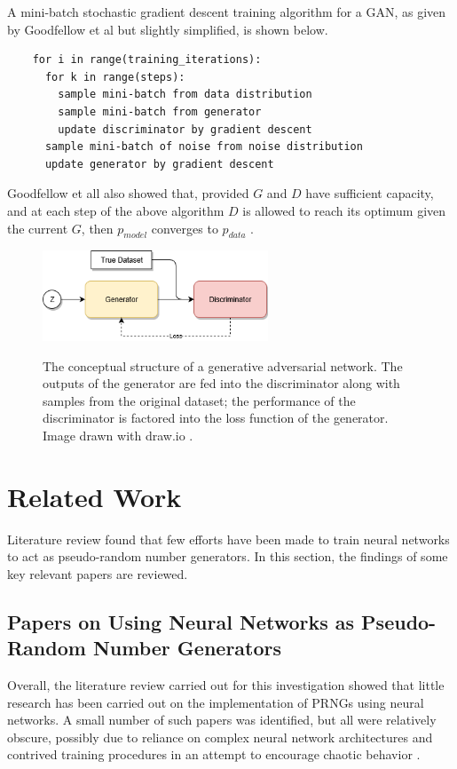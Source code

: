\documentclass[12pt, titlepage]{report}
\theoremstyle{definition}
\begin{document}
A mini-batch stochastic gradient descent training algorithm for a GAN, as given by Goodfellow et al but slightly simplified, is shown below.
\begin{verbatim}
    for i in range(training_iterations):
      for k in range(steps):
        sample mini-batch from data distribution
        sample mini-batch from generator
        update discriminator by gradient descent
      sample mini-batch of noise from noise distribution
      update generator by gradient descent
\end{verbatim}
Goodfellow et all also showed that, provided $G$ and $D$ have sufficient capacity, and at each step of the above algorithm $D$ is allowed to reach its optimum given the current $G$, then $p_{model}$ converges to $p_{data}$ \cite[p. 5]{goodfellow2014generative}.

\begin{figure}
    \centering
    \includegraphics[width=0.6\textwidth]{img/gan.png}\\
    \caption[Generative adversarial network conceptual structure]{The conceptual structure of a generative adversarial network. The outputs of the generator are fed into the discriminator along with samples from the original dataset; the performance of the discriminator is factored into the loss function of the generator. Image drawn with draw.io \cite{jgraph2018draw}.}
    \label{figure:gan}
\end{figure}



\section{Related Work}\label{section:related_work}
Literature review found that few efforts have been made to train neural networks to act as pseudo-random number generators. In this section, the findings of some key relevant papers are reviewed.



\subsection{Papers on Using Neural Networks as Pseudo-Random Number Generators}
Overall, the literature review carried out for this investigation showed that little research has been carried out on the implementation of PRNGs using neural networks. A small number of such papers was identified, but all were relatively obscure, possibly due to reliance on complex neural network architectures and contrived training procedures in an attempt to encourage chaotic behavior \cite{desai2011pseudo} \cite{desai2012pseudo} \cite{tirdad2010hopfield} \cite{wen2014exponential}.
\end{document}
